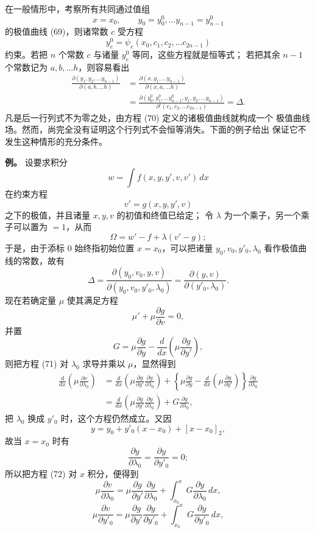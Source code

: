 \documentclass[11pt,a4paper,leqno]{article}
\begin{document}
在一般情形中，考察所有共同通过值组
\[
x=x_0,\qquad y_0=y_0^0,\ldots y_{n-1}=y_{n-1}^0
\]
的极值曲线 (69)，则诸常数 $c$ 受方程
\begin{equation}\tag{70}
y_e^0=\psi_e(x_0,c_1,c_2,\ldots c_{2n-1})
\end{equation}
约束。若把 $n$ 个常数 $c$ 与诸量 $y_e^0$ 等同，这些方程就是恒等式；
若把其余 $n-1$ 个常数记为 $a,b,\ldots h$，则容易看出
\[
\begin{aligned}
\frac{\partial(y_1,y_2,\ldots y_{n-1})}{\partial(a,b,\ldots h)}
&=\frac{\partial(x,y_1,\ldots y_{n-1})}{\partial(x,a,\ldots h)}\\
&=\frac{\partial(y_0^0,y_1^0,\ldots y_{n-1}^0,y_1,y_2,\ldots y_{n-1})}
{\partial'(c_1,c_2,\ldots c_{2n-1})}=\Delta.
\end{aligned}
\]
凡是后一行列式不为零之处，由方程 (70) 定义的诸极值曲线就构成一个
极值曲线场。然而，尚完全没有证明这个行列式不会恒等消失。下面的例子给出
保证它不发生这种情形的充分条件。

\noindent\textbf{例。} 设要求积分
\[
w=\int f(x,y,y',v,v')\,dx
\]
在约束方程
\begin{equation}\tag{71}
v'=g(x,y,y',v)
\end{equation}
之下的极值，并且诸量 $x,y,v$ 的初值和终值已给定；
令 $\lambda$ 为一个乘子，另一个乘子可以置为 $=1$，从而
\[
\Omega=w'-f+\lambda(v'-g);
\]
于是，由于添标 0 始终指初始位置 $x=x_0$，可以把诸量
$y_0,v_0,y'_0,\lambda_0$ 看作极值曲线的常数，故有
\[
\Delta=
\frac{\partial(y_0,v_0,y,v)}{\partial(y_0,v_0,y'_0,\lambda_0)}
=\frac{\partial(y,v)}{\partial(y'_0,\lambda_0)}.
\]
现在若确定量 $\mu$ 使其满足方程
\[
\mu'+\mu\frac{\partial g}{\partial v}=0,
\]
并置
\[
G=\mu\frac{\partial g}{\partial y}
-\frac{d}{dx}\left(\mu\frac{\partial g}{\partial y'}\right),
\]
则把方程 (71) 对 $\lambda_0$ 求导并乘以 $\mu$，显然得到
\begin{equation}\tag{72}
\begin{aligned}
\frac{d}{dx}\left(\mu\frac{\partial v}{\partial\lambda_0}\right)
&=\frac{d}{dx}\left(\mu\frac{\partial g}{\partial y'}
\frac{\partial y}{\partial\lambda_0}\right)
+\left\{\mu\frac{\partial g}{\partial y}
-\frac{d}{dx}\left(\mu\frac{\partial g}{\partial y'}\right)\right\}
\frac{\partial y}{\partial\lambda_0}\\
&=\frac{d}{dx}\left(\mu\frac{\partial g}{\partial y'}
\frac{\partial y}{\partial\lambda_0}\right)
+G\frac{\partial y}{\partial\lambda_0},
\end{aligned}
\end{equation}
把 $\lambda_0$ 换成 $y'_0$ 时，这个方程仍然成立。又因
\begin{equation}\tag{73}
y=y_0+y'_0(x-x_0)+[x-x_0]_2,
\end{equation}
故当 $x=x_0$ 时有
\[
\frac{\partial y}{\partial\lambda_0}
=\frac{\partial y}{\partial y'_0}=0;
\]
所以把方程 (72) 对 $x$ 积分，便得到
\[
\mu\frac{\partial v}{\partial\lambda_0}
=\mu\frac{\partial g}{\partial y'}\frac{\partial y}{\partial\lambda_0}
+\int_{x_0}^{x}G\frac{\partial y}{\partial\lambda_0}\,dx,
\]
\[
\mu\frac{\partial v}{\partial y'_0}
=\mu\frac{\partial g}{\partial y'}\frac{\partial y}{\partial y'_0}
+\int_{x_0}^{x}G\frac{\partial y}{\partial y'_0}\,dx,
\]
\end{document}

